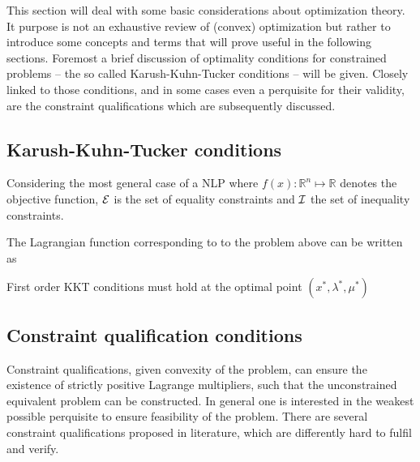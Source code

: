 This section will deal with some basic considerations about optimization theory. It purpose is not 
an exhaustive review of (convex) optimization but rather to introduce some concepts and terms that will 
prove useful in the following sections. Foremost a brief discussion of optimality conditions for constrained 
problems -- the so called Karush-Kuhn-Tucker conditions -- will be given. Closely linked to those conditions, 
and in some cases even a perquisite for their validity, are the constraint qualifications which are subsequently
discussed. 

    \subsection{Karush-Kuhn-Tucker conditions}
    \label{sec:opt:theory:kkt}
    Considering the most general case of a NLP
    where $f(x): \mathbb{R}^n \mapsto \mathbb{R}$ denotes the objective function, $\mathcal{E}$ is the set of equality
    constraints and $\mathcal{I}$ the set of inequality constraints.

    The Lagrangian function corresponding to to the problem above can be written as

    First order KKT conditions must hold at the optimal point $(x^{\ast}, \lambda^{\ast}, \mu^{\ast})$

    \subsection{Constraint qualification conditions}
    \label{sec:opt:theory:cq}
    
    Constraint qualifications, given convexity of the problem, can ensure the existence of strictly positive Lagrange 
    multipliers, such that the unconstrained equivalent problem can be constructed. In general one is interested 
    in the weakest possible perquisite to ensure feasibility  of the problem. 
    There are several constraint qualifications proposed in literature, which are differently hard to fulfil 
    and verify. 

